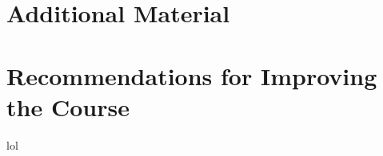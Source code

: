 \documentclass[]{book}
\begin{document}
\chapter{Additional Material}







\begin{landscape}

\end{landscape}
\chapter{Recommendations for Improving the Course}
lol
\end{document}
